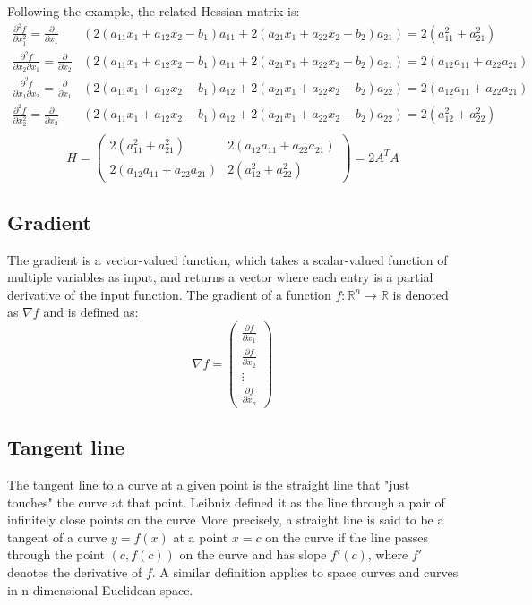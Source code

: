 Following the example, the related Hessian matrix is:
$$
\begin{aligned}
\frac{\partial^2 f}{\partial x_1^2} = \frac{\partial}{\partial x_1} &\left( 2(a_{11}x_1 + a_{12}x_2 - b_1)a_{11} + 2(a_{21}x_1 + a_{22}x_2 - b_2)a_{21} \right) = 2(a_{11}^2 + a_{21}^2) \\
\frac{\partial^2 f}{\partial x_2 \partial x_1} = \frac{\partial}{\partial x_2} &\left( 2(a_{11}x_1 + a_{12}x_2 - b_1)a_{11} + 2(a_{21}x_1 + a_{22}x_2 - b_2)a_{21} \right) = 2(a_{12}a_{11} + a_{22}a_{21}) \\
\frac{\partial^2 f}{\partial x_1 \partial x_2} = \frac{\partial}{\partial x_1} &\left( 2(a_{11}x_1 + a_{12}x_2 - b_1)a_{12} + 2(a_{21}x_1 + a_{22}x_2 - b_2)a_{22} \right) = 2(a_{12}a_{11} + a_{22}a_{21}) \\
\frac{\partial^2 f}{\partial x_2^2} = \frac{\partial}{\partial x_2} &\left( 2(a_{11}x_1 + a_{12}x_2 - b_1)a_{12} + 2(a_{21}x_1 + a_{22}x_2 - b_2)a_{22} \right) = 2(a_{12}^2 + a_{22}^2) \\
\end{aligned}
$$
$$ H = \begin{pmatrix}
2(a_{11}^2 + a_{21}^2) & 2(a_{12}a_{11} + a_{22}a_{21}) \\
2(a_{12}a_{11} + a_{22}a_{21}) & 2(a_{12}^2 + a_{22}^2)
\end{pmatrix} = 2A^TA
$$

\subsection{Gradient}
The gradient is a vector-valued function, which takes a scalar-valued function of multiple variables as input, and returns a vector where each entry is a partial derivative of the input function. The gradient of a function \( f: \mathbb{R}^n \rightarrow \mathbb{R} \) is denoted as \( \nabla f \) and is defined as:
$$ \nabla f = \begin{pmatrix}
\frac{\partial f}{\partial x_1} \\
\frac{\partial f}{\partial x_2} \\
\vdots \\
\frac{\partial f}{\partial x_n}
\end{pmatrix} $$

\subsection{Tangent line}
The tangent line to a curve at a given point is the straight line that "just touches" the curve at that point.
Leibniz defined it as the line through a pair of infinitely close points on the curve
More precisely, a straight line is said to be a tangent of a curve \( y = f(x) \) at a
point \( x = c \) on the curve if the line passes through the point \( (c, f(c)) \) on
the curve and has slope \( f'(c) \), where \( f' \) denotes the derivative of \( f \).
A similar definition applies to space curves and curves in n-dimensional Euclidean space.

